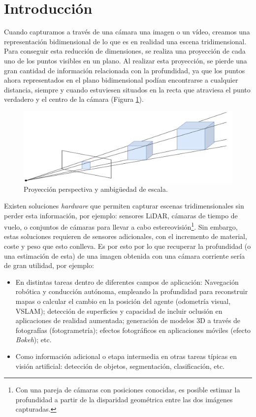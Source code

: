 \section{Introducción}

Cuando capturamos a través de una cámara una imagen o un vídeo, creamos una representación bidimensional de lo que es en realidad una escena tridimensional. Para conseguir esta reducción de dimensiones, se realiza una proyección de cada uno de los puntos visibles en un plano. Al realizar esta proyección, se pierde una gran cantidad de información relacionada con la profundidad, ya que los puntos ahora representados en el plano bidimensional podían encontrarse a cualquier distancia, siempre y cuando estuviesen situados en la recta que atraviesa el punto verdadero y el centro de la cámara (Figura \ref{fig:proyeccion-perspectiva}).

\begin{figure}[H]
\centering
\includegraphics[width=0.65\linewidth]{imagenes/proyeccion-perspectiva.png} 
\captionsetup{width=.8\linewidth}
\caption{Proyección perspectiva y ambigüedad de escala.}
\label{fig:proyeccion-perspectiva}
\end{figure}

Existen soluciones \textit{hardware} que permiten capturar escenas tridimensionales sin perder esta información, por ejemplo: sensores LiDAR, cámaras de tiempo de vuelo, o conjuntos de cámaras para llevar a cabo estereovisión\footnote{Con una pareja de cámaras con posiciones conocidas, es posible estimar la profundidad a partir de la disparidad geométrica entre las dos imágenes capturadas.}\cite{hartley_zisserman_2004}. Sin embargo, estas soluciones requieren de sensores adicionales, con el incremento de material, coste y peso que esto conlleva. Es por esto por lo que recuperar la profundidad (o una estimación de esta) de una imagen obtenida con una cámara corriente sería de gran utilidad, por ejemplo:

\begin{itemize}
    \item En distintas tareas dentro de diferentes campos de aplicación: Navegación robótica y conducción autónoma, empleando la profundidad para reconstruir mapas o calcular el cambio en la posición del agente (odometría visual, VSLAM); detección de superficies y capacidad de incluir oclusión en aplicaciones de realidad aumentada; generación de modelos 3D a través de fotografías (fotogrametría); efectos fotográficos en aplicaciones móviles (efecto \textit{Bokeh}); etc.
    \item Como información adicional o etapa intermedia en otras tareas típicas en visión artificial: detección de objetos, segmentación, clasificación, etc.
\end{itemize}

